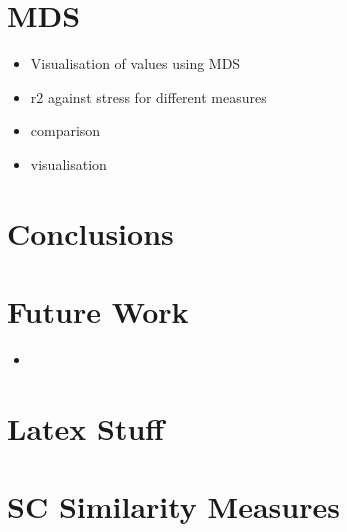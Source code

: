 \documentclass{article}
\begin{document}
\section{MDS}
\label{sec-11}

\begin{itemize}
\item Visualisation of values using MDS
\item r2 against stress for different measures
\item comparison
\item visualisation
\end{itemize}
\section{Conclusions}
\label{sec-12}
\section{Future Work}
\label{sec-13}

\begin{itemize}
\item 
\end{itemize}
\section{Latex Stuff}
\label{sec-14}

\clearpage



\clearpage
\appendix
\section{SC Similarity Measures}
\label{sec-15}
\end{document}
